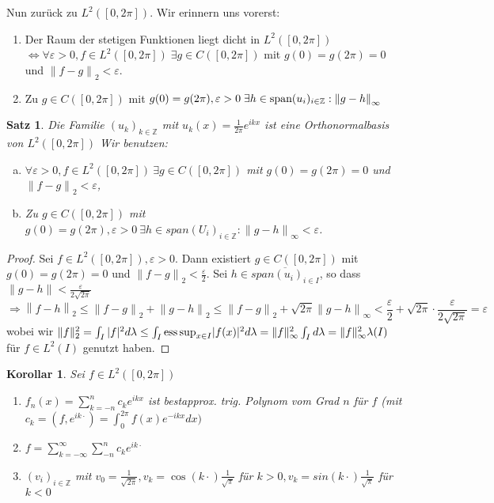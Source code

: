 \documentclass[ngerman]{report}
\theoremstyle{plain}%
\newtheorem{thm}{Satz}[chapter]
\newtheorem*{cor*}{Korollar}
\theoremstyle{definition}%
\theoremstyle{myStyle}
\newcommand{\Z}{\mathbb{Z}}
\newcommand{\ess}{\textnormal{ess}}
\newcommand{\aufspan}{\textnormal{span}}
\newcommand{\norm}[1]{\left \|#1\right\| }
\newcommand{\df}[1][]{%
	\overset{#1}{\Rightarrow}
}
\newcommand{\ff}[3]{(#1_#2)_{#2\in#3}}
\begin{document}
	Nun zurück zu $L^2([0,2\pi]).$
	Wir erinnern uns vorerst:	 
			\begin{enumerate}
				\item Der Raum der stetigen Funktionen liegt dicht in $L^2([0,2\pi])$\\
				 $\Leftrightarrow \forall \varepsilon > 0, f\in L^2([0,2\pi])\; \exists g\in C([0,2\pi])$ mit 
				$g(0) = g(2\pi) = 0$ und $\norm{f-g}_2 < \varepsilon$.
				\item Zu $g\in C([0,2\pi])$ mit $g(0) = g(2\pi), \varepsilon > 0 \;\exists h\in \aufspan\ff{u}{i}{\Z}: \norm{g-h}_\infty$
			\end{enumerate}
	\begin{thm} 
		Die Familie $\ff{u}{k}{\Z}$ mit $u_k(x) = \frac{1}{2 \pi} e^{ikx}$ ist eine Orthonormalbasis von $L^2([0,2\pi])$ 
		Wir benutzen:	 
			\begin{enumerate}[a)]
				\item $\forall \varepsilon > 0, f\in L^2([0,2\pi]) ~\exists g\in C([0,2\pi])$ mit $g(0) = g(2\pi) = 0$ und $\norm{f-g}_2 < \varepsilon$,
				\item Zu $g\in C([0,2\pi])$ mit $g(0) = g(2\pi), \varepsilon > 0 ~\exists h\in span(U_i)_{i \in \Z}: \norm{g-h}_\infty < \varepsilon$.
			\end{enumerate}

	\end{thm}
	\begin{proof}
		Sei $f\in L^2([0,2\pi]), \varepsilon > 0$.
		Dann existiert $g\in C([0,2\pi])$ mit $g(0) = g(2\pi) = 0$ und $\norm{f-g}_2 < \frac{\varepsilon}{2}$.
		Sei $h\in \overline{span\ff{u}{i}{I}}$, so dass $\norm{g-h} < \frac{\varepsilon}{2\sqrt{2\pi}}$
		$$\df \norm{f-h}_2 \leq \norm{f-g}_2 + \norm{g-h}_2 \leq \norm{f-g}_2 + \sqrt{2\pi} \norm{g-h}_\infty < \frac{\varepsilon}{2} + \sqrt{2\pi} \cdot \frac{\varepsilon}{2\sqrt{2\pi}} = \varepsilon$$
		wobei wir $\|f\|^2_2 = \int_I |f|^2 d\lambda \leq \int_I {\ess \sup}_{x\in I} |f(x)|^2 d\lambda = \|f\|^2_\infty \int_I d\lambda = \|f\|^2_\infty \lambda(I)$ für $f\in L^2(I)$ genutzt haben.
	\end{proof}

	\begin{cor*}
Sei $f\in L^2([0,2\pi])$
		\begin{enumerate}
			\item $f_n(x) = \sum_{k=-n}^n c_k e^{ikx}$ ist bestapprox. trig. Polynom vom Grad $n$ für $f$ (mit $c_k = (f,e^{ik\cdot })=\int_{0}^{2\pi} f(x) e^{-ikx} dx)$ 
			\item $f = \sum_{k= -\infty}^{\infty} \sum_{-n}^n c_k e^{ik\cdot} $
			\item $\ff{v}{i}{\Z}$ mit $v_0 = \frac{1}{\sqrt{2\pi}}, v_k = \cos(k\cdot) \frac{1}{\sqrt{\pi}} $ für $ k>0, v_k = sin(k\cdot) \frac{1}{\sqrt{\pi}} $ für $k< 0$
		\end{enumerate}
	\end{cor*}
\end{document}

